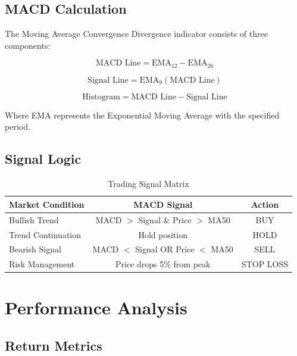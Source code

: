 \documentclass[11pt,a4paper]{article}
\begin{document}
\subsection{MACD Calculation}

The Moving Average Convergence Divergence indicator consists of three components:

\begin{equation}
\text{MACD Line} = \text{EMA}_{12} - \text{EMA}_{26}
\end{equation}

\begin{equation}
\text{Signal Line} = \text{EMA}_9(\text{MACD Line})
\end{equation}

\begin{equation}
\text{Histogram} = \text{MACD Line} - \text{Signal Line}
\end{equation}

Where EMA represents the Exponential Moving Average with the specified period.

\subsection{Signal Logic}

\begin{table}[H]
\centering
\begin{tabular}{lcc}
\toprule
\textbf{Market Condition} & \textbf{MACD Signal} & \textbf{Action} \\
\midrule
Bullish Trend & MACD $>$ Signal \& Price $>$ MA50 & \textcolor{profit}{BUY} \\
Trend Continuation & Hold position & HOLD \\
Bearish Signal & MACD $<$ Signal OR Price $<$ MA50 & \textcolor{loss}{SELL} \\
Risk Management & Price drops 5\% from peak & \textcolor{loss}{STOP LOSS} \\
\bottomrule
\end{tabular}
\caption{Trading Signal Matrix}
\end{table}

\vspace{1cm}  

\section{Performance Analysis}

\subsection{Return Metrics}
\end{document}
